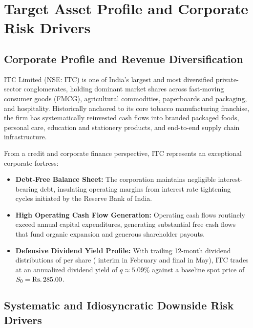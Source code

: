 
\section{Target Asset Profile and Corporate Risk Drivers}
\label{sec:asset_profile}

\subsection{Corporate Profile and Revenue Diversification}

ITC Limited (NSE: ITC) is one of India's largest and most diversified private-sector conglomerates, holding dominant market shares across fast-moving consumer goods (FMCG), agricultural commodities, paperboards and packaging, and hospitality. Historically anchored to its core tobacco manufacturing franchise, the firm has systematically reinvested cash flows into branded packaged foods, personal care, education and stationery products, and end-to-end supply chain infrastructure.

From a credit and corporate finance perspective, ITC represents an exceptional corporate fortress:
\begin{itemize}[leftmargin=1.5em, itemsep=1pt, parsep=0pt]
    \item \textbf{Debt-Free Balance Sheet:} The corporation maintains negligible interest-bearing debt, insulating operating margins from interest rate tightening cycles initiated by the Reserve Bank of India.
    \item \textbf{High Operating Cash Flow Generation:} Operating cash flows routinely exceed annual capital expenditures, generating substantial free cash flows that fund organic expansion and generous shareholder payouts.
    \item \textbf{Defensive Dividend Yield Profile:} With trailing 12-month dividend distributions of  per share ( interim in February and  final in May), ITC trades at an annualized dividend yield of $q \approx 5.09\%$ against a baseline spot price of $S_0 = \text{\text{Rs.}\,}285.00$.
\end{itemize}

\subsection{Systematic and Idiosyncratic Downside Risk Drivers}

